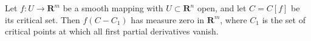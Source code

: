 Let $f: U \to \mathbf{R}^m$ be a smooth mapping with $U \subset \mathbf{R}^n$ open, and let $C = C[f]$ be its critical set. Then $f(C - C_1)$ has measure zero in $\mathbf{R}^m$, where $C_1$ is the set of critical points at which all first partial derivatives vanish.
